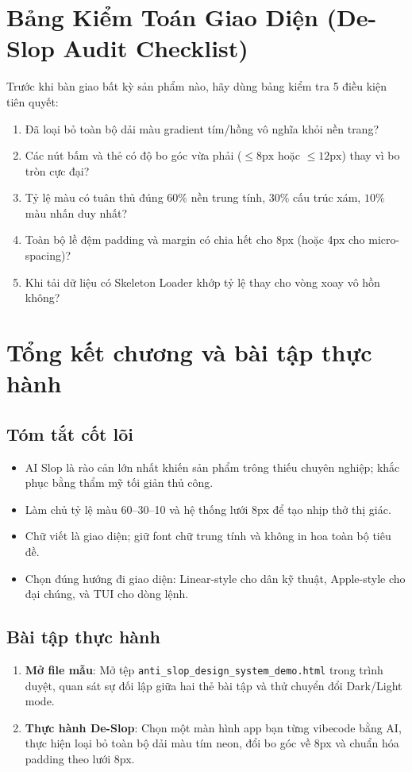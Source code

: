 \documentclass[a4paper,11pt]{article}
\begin{document}
\section{Bảng Kiểm Toán Giao Diện (De-Slop Audit Checklist)}

Trước khi bàn giao bất kỳ sản phẩm nào, hãy dùng bảng kiểm tra 5 điều kiện tiên quyết:
\begin{enumerate}[label={$\square$}]
    \item Đã loại bỏ toàn bộ dải màu gradient tím/hồng vô nghĩa khỏi nền trang?
    \item Các nút bấm và thẻ có độ bo góc vừa phải ($\le 8\text{px}$ hoặc $\le 12\text{px}$) thay vì bo tròn cực đại?
    \item Tỷ lệ màu có tuân thủ đúng $60\%$ nền trung tính, $30\%$ cấu trúc xám, $10\%$ màu nhấn duy nhất?
    \item Toàn bộ lề đệm padding và margin có chia hết cho 8px (hoặc 4px cho micro-spacing)?
    \item Khi tải dữ liệu có Skeleton Loader khớp tỷ lệ thay cho vòng xoay vô hồn không?
\end{enumerate}

\section{Tổng kết chương và bài tập thực hành}

\subsection{Tóm tắt cốt lõi}
\begin{itemize}[leftmargin=1.5em]
    \item AI Slop là rào cản lớn nhất khiến sản phẩm trông thiếu chuyên nghiệp; khắc phục bằng thẩm mỹ tối giản thủ công.
    \item Làm chủ tỷ lệ màu 60--30--10 và hệ thống lưới 8px để tạo nhịp thở thị giác.
    \item Chữ viết là giao diện; giữ font chữ trung tính và không in hoa toàn bộ tiêu đề.
    \item Chọn đúng hướng đi giao diện: Linear-style cho dân kỹ thuật, Apple-style cho đại chúng, và TUI cho dòng lệnh.
\end{itemize}

\subsection{Bài tập thực hành}
\begin{enumerate}[label={\arabic*.}]
    \item \textbf{Mở file mẫu}: Mở tệp \texttt{anti\_slop\_design\_system\_demo.html} trong trình duyệt, quan sát sự đối lập giữa hai thẻ bài tập và thử chuyển đổi Dark/Light mode.
    \item \textbf{Thực hành De-Slop}: Chọn một màn hình app bạn từng vibecode bằng AI, thực hiện loại bỏ toàn bộ dải màu tím neon, đổi bo góc về 8px và chuẩn hóa padding theo lưới 8px.
\end{enumerate}
\end{document}
